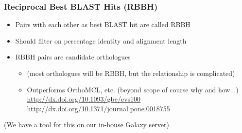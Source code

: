 \documentclass[table]{beamer}
\begin{document}
\begin{frame}
\frametitle{Reciprocal Best BLAST Hits (RBBH)}
\begin{itemize}
\item Pairs with each other as best BLAST hit are called RBBH
\item Should filter on percentage identity and alignment length
\item RBBH pairs are candidate orthologues
\begin{itemize}
  \item (most orthologues will be RBBH, but the relationship is complicated)
  \item Outperforms OrthoMCL, etc. (beyond scope of course why and how$\ldots$) \\
           \url{http://dx.doi.org/10.1093/gbe/evs100} \\
           \url{http://dx.doi.org/10.1371/journal.pone.0018755}
\end{itemize}
\end{itemize}
(We have a tool for this on our in-house Galaxy server)
\end{frame}

%
\end{document}
